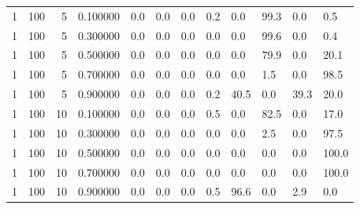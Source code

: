 \begin{tabular}{rrrrllllllll}
1 & 100 & 5 & 0.100000 & 0.0 & 0.0 & 0.0 & 0.2 & 0.0 & 99.3 & 0.0 & 0.5 \\
1 & 100 & 5 & 0.300000 & 0.0 & 0.0 & 0.0 & 0.0 & 0.0 & 99.6 & 0.0 & 0.4 \\
1 & 100 & 5 & 0.500000 & 0.0 & 0.0 & 0.0 & 0.0 & 0.0 & 79.9 & 0.0 & 20.1 \\
1 & 100 & 5 & 0.700000 & 0.0 & 0.0 & 0.0 & 0.0 & 0.0 & 1.5 & 0.0 & 98.5 \\
1 & 100 & 5 & 0.900000 & 0.0 & 0.0 & 0.0 & 0.2 & 40.5 & 0.0 & 39.3 & 20.0 \\
1 & 100 & 10 & 0.100000 & 0.0 & 0.0 & 0.0 & 0.5 & 0.0 & 82.5 & 0.0 & 17.0 \\
1 & 100 & 10 & 0.300000 & 0.0 & 0.0 & 0.0 & 0.0 & 0.0 & 2.5 & 0.0 & 97.5 \\
1 & 100 & 10 & 0.500000 & 0.0 & 0.0 & 0.0 & 0.0 & 0.0 & 0.0 & 0.0 & 100.0 \\
1 & 100 & 10 & 0.700000 & 0.0 & 0.0 & 0.0 & 0.0 & 0.0 & 0.0 & 0.0 & 100.0 \\
1 & 100 & 10 & 0.900000 & 0.0 & 0.0 & 0.0 & 0.5 & 96.6 & 0.0 & 2.9 & 0.0 \\
\bottomrule
\end{tabular}
